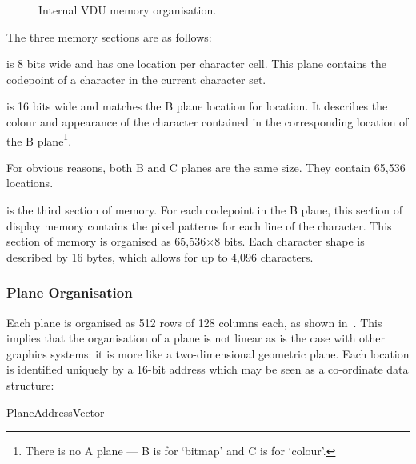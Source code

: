 \begin{figure}
 \centering
 \caption[VDU Memory Map]{\label{fig:vdu-memory-map} Internal VDU memory organisation.}
\end{figure}

The three memory sections are as follows:

\begin{description}
   is 8 bits wide and has one location per character cell. This plane
  contains the \gls{codepoint} of a character in the current character set.

   is 16 bits wide and matches the B plane location for location. It
  describes the colour and appearance of the character contained in the
  corresponding location of the B plane\footnote{There is no A plane — B is for
    ‘bitmap’ and C is for ‘colour’.}.

  For obvious reasons, both B and C planes are the same size. They contain 65,536
  locations.

   is the third section of memory. For each
  codepoint in the B plane, this section of display memory contains the pixel
  patterns for each line of the character. This section of memory is organised as
  65,536×8 bits. Each character shape is described by 16 bytes, which allows for
  up to 4,096 characters.
\end{description}


\subsubsection{Plane Organisation}

Each plane is organised as 512 rows of 128 columns each, as shown
in~. This implies that the organisation of a plane is not
linear as is the case with other graphics systems: it is more like a
two-dimensional geometric plane. Each location is identified uniquely by a
16-bit address which may be seen as a co-ordinate data structure:


\begin{bitfield}
\end{bitfield}

\begin{datastructure}[Bits]{PlaneAddressVector}
\end{datastructure}


